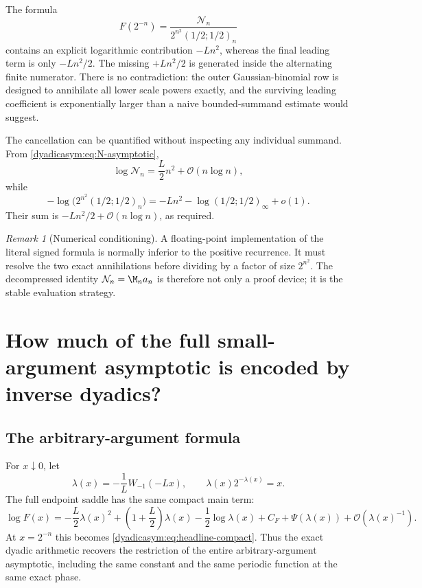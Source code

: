 \documentclass[11pt,oneside]{article}
\theoremstyle{definition}
\theoremstyle{remark}
\newtheorem{remark}[theorem]{Remark}
\newcommand{\bigO}{\mathcal O}
\newcommand{\smallo}{o}
\begin{document}
The formula
\begin{equation*}
 F(2^{-n})=\frac{\mathcal N_n}{2^{n^2}(1/2;1/2)_n}
\end{equation*}
contains an explicit logarithmic contribution $-Ln^2$, whereas the final leading term is only
$-Ln^2/2$.  The missing $+Ln^2/2$ is generated inside the alternating finite numerator.
There is no contradiction: the outer Gaussian-binomial row is designed to annihilate all
lower scale powers exactly, and the surviving leading coefficient is exponentially larger
than a naive bounded-summand estimate would suggest.

The cancellation can be quantified without inspecting any individual summand.  From
\eqref{dyadicasym:eq:N-asymptotic},
\begin{equation}
 \log\mathcal N_n=\frac L2n^2+\bigO(n\log n),               \label{dyadicasym:eq:N-leading}
\end{equation}
while
\begin{equation}
 -\log\bigl(2^{n^2}(1/2;1/2)_n\bigr)
 =-Ln^2-\log(1/2;1/2)_\infty+\smallo(1).                   \label{dyadicasym:eq:q-den-leading}
\end{equation}
Their sum is $-Ln^2/2+\bigO(n\log n)$, as required.

\begin{remark}[Numerical conditioning]
A floating-point implementation of the literal signed formula is normally inferior to the
positive recurrence.  It must resolve the two exact annihilations before dividing by a factor
of size $2^{n^2}$.  The decompressed identity $\mathcal N_n=\M_na_n$ is therefore not only a
proof device; it is the stable evaluation strategy.
\end{remark}

\section{How much of the full small-argument asymptotic is encoded by inverse dyadics?}
\label{dyadicasym:sec:general-x}

\subsection{The arbitrary-argument formula}

For $x\downarrow0$, let
\begin{equation}
 \lambda(x)=-\frac1L W_{-1}(-Lx),
 \qquad
 \lambda(x)2^{-\lambda(x)}=x.                              \label{dyadicasym:eq:lambda-x}
\end{equation}
The full endpoint saddle has the same compact main term:
\begin{equation}
 \log F(x)=
 -\frac L2\lambda(x)^2+
 \left(1+\frac L2\right)\lambda(x)-\frac12\log\lambda(x)
 +C_F+\Psi(\lambda(x))+\bigO(\lambda(x)^{-1}).              \label{dyadicasym:eq:general-x-main}
\end{equation}
At $x=2^{-n}$ this becomes \eqref{dyadicasym:eq:headline-compact}.  Thus the exact dyadic arithmetic
recovers the restriction of the entire arbitrary-argument asymptotic, including the same
constant and the same periodic function at the same exact phase.
\end{document}
